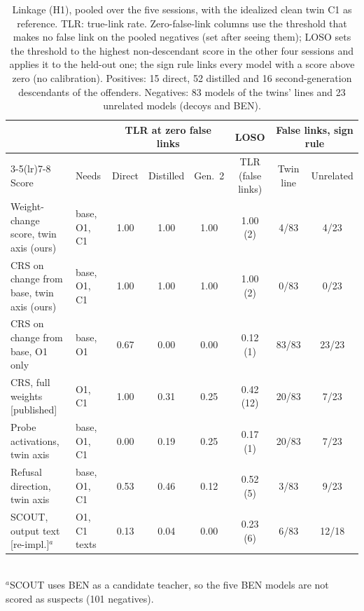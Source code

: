 \begin{table}[t]\centering\caption{Linkage (H1), pooled over the five sessions, with the idealized clean twin C1 as reference. TLR: true-link rate. Zero-false-link columns use the threshold that makes no false link on the pooled negatives (set after seeing them); LOSO sets the threshold to the highest non-descendant score in the other four sessions and applies it to the held-out one; the sign rule links every model with a score above zero (no calibration). Positives: 15 direct, 52 distilled and 16 second-generation descendants of the offenders. Negatives: 83 models of the twins' lines and 23 unrelated models (decoys and BEN).}\label{tab:linkage}
\begin{tabular}{llcccccc}\toprule
 & & \multicolumn{3}{c}{TLR at zero false links} & LOSO & \multicolumn{2}{c}{False links, sign rule} \\\cmidrule(lr){3-5}\cmidrule(lr){7-8}
Score & Needs & Direct & Distilled & Gen.~2 & TLR (false links) & Twin line & Unrelated \\\midrule
Weight-change score, twin axis (ours) & base, O1, C1 & 1.00 & 1.00 & 1.00 & 1.00 (2) & 4/83 & 4/23 \\
CRS on change from base, twin axis (ours) & base, O1, C1 & 1.00 & 1.00 & 1.00 & 1.00 (2) & 0/83 & 0/23 \\
CRS on change from base, O1 only & base, O1 & 0.67 & 0.00 & 0.00 & 0.12 (1) & 83/83 & 23/23 \\
CRS, full weights [published] & O1, C1 & 1.00 & 0.31 & 0.25 & 0.42 (12) & 20/83 & 7/23 \\
Probe activations, twin axis & base, O1, C1 & 0.00 & 0.19 & 0.25 & 0.17 (1) & 20/83 & 7/23 \\
Refusal direction, twin axis & base, O1, C1 & 0.53 & 0.46 & 0.12 & 0.52 (5) & 3/83 & 9/23 \\
SCOUT, output text [re-impl.]$^a$ & O1, C1 texts & 0.13 & 0.04 & 0.00 & 0.23 (6) & 6/83 & 12/18 \\
\bottomrule\end{tabular}
\\[2pt]\footnotesize $^a$SCOUT uses BEN as a candidate teacher, so the five BEN models are not scored as suspects (101 negatives).
\end{table}
